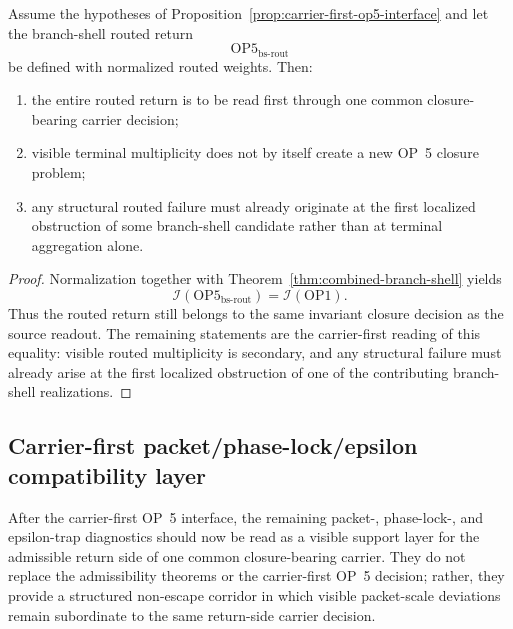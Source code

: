\begin{corollary}
\label{cor:carrier-first-routed-op5}
Assume the hypotheses of Proposition~\ref{prop:carrier-first-op5-interface} and let the branch-shell routed return
\[
\mathrm{OP5}_{\mathrm{bs\text{-}rout}}
\]
be defined with normalized routed weights. Then:
\begin{enumerate}[leftmargin=2em,label=(\roman*)]
\item the entire routed return is to be read first through one common closure-bearing carrier decision;
\item visible terminal multiplicity does not by itself create a new OP~5 closure problem;
\item any structural routed failure must already originate at the first localized obstruction of some branch-shell candidate rather than at terminal aggregation alone.
\end{enumerate}
\end{corollary}

\begin{proof}
Normalization together with Theorem~\ref{thm:combined-branch-shell} yields
\[
\mathcal{I}(\mathrm{OP5}_{\mathrm{bs\text{-}rout}})=\mathcal{I}(\mathrm{OP1}).
\]
Thus the routed return still belongs to the same invariant closure decision as the source readout. The remaining statements are the carrier-first reading of this equality: visible routed multiplicity is secondary, and any structural failure must already arise at the first localized obstruction of one of the contributing branch-shell realizations.
\end{proof}

\subsection{Carrier-first packet/phase-lock/epsilon compatibility layer}
\label{sec:packet-phase-epsilon-compatibility}

After the carrier-first OP~5 interface, the remaining packet-, phase-lock-, and epsilon-trap diagnostics should now be read as a visible support layer for the admissible return side of one common closure-bearing carrier. They do not replace the admissibility theorems or the carrier-first OP~5 decision; rather, they provide a structured non-escape corridor in which visible packet-scale deviations remain subordinate to the same return-side carrier decision.

